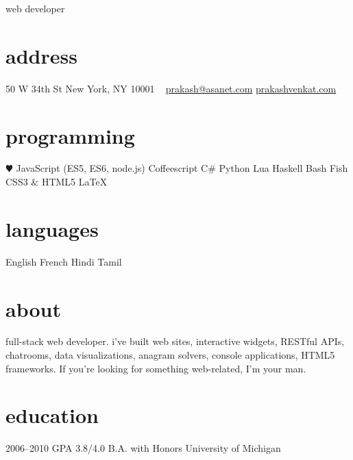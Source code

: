 \documentclass[]{friggeri-cv}
\begin{document}
       {web developer}


\begin{aside}
  \section{address}
    50 W 34th St
    New York, NY 10001
    ~
    \href{mailto:prakash@asanet.com}{prakash@asanet.com}
    \href{http://prakashvenkat.com}{prakashvenkat.com}
  \section{programming}
    {\color{red} $\varheartsuit$} JavaScript
    (ES5, ES6, node.js)
    Coffeescript
    C\#
    Python
    Lua
    Haskell
    Bash
    Fish
    CSS3 \& HTML5
    LaTeX
  \section{languages}
    English
    French
    Hindi
    Tamil
\end{aside}

\section{about}
full-stack web developer. i've built web sites, interactive widgets, RESTful
APIs, chatrooms, data visualizations, anagram solvers, console applications, 
HTML5 frameworks. If you're looking for something web-related, I'm your man.

\section{education}

\begin{entrylist}
  \entry
    {2006–2010}
    {GPA 3.8/4.0}
    {B.A. with Honors}
    {University of Michigan}
\end{entrylist}
\end{document}

